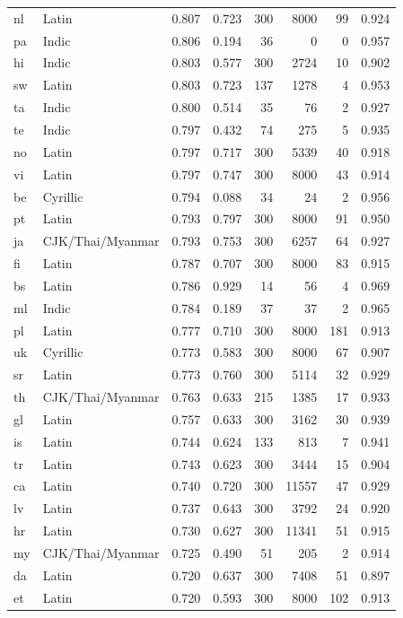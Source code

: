 \begin{tabular}{llrrrrrr}
nl & Latin & 0.807 & 0.723 & 300 & 8000 & 99 & 0.924 \\
pa & Indic & 0.806 & 0.194 & 36 & 0 & 0 & 0.957 \\
hi & Indic & 0.803 & 0.577 & 300 & 2724 & 10 & 0.902 \\
sw & Latin & 0.803 & 0.723 & 137 & 1278 & 4 & 0.953 \\
ta & Indic & 0.800 & 0.514 & 35 & 76 & 2 & 0.927 \\
te & Indic & 0.797 & 0.432 & 74 & 275 & 5 & 0.935 \\
no & Latin & 0.797 & 0.717 & 300 & 5339 & 40 & 0.918 \\
vi & Latin & 0.797 & 0.747 & 300 & 8000 & 43 & 0.914 \\
be & Cyrillic & 0.794 & 0.088 & 34 & 24 & 2 & 0.956 \\
pt & Latin & 0.793 & 0.797 & 300 & 8000 & 91 & 0.950 \\
ja & CJK/Thai/Myanmar & 0.793 & 0.753 & 300 & 6257 & 64 & 0.927 \\
fi & Latin & 0.787 & 0.707 & 300 & 8000 & 83 & 0.915 \\
bs & Latin & 0.786 & 0.929 & 14 & 56 & 4 & 0.969 \\
ml & Indic & 0.784 & 0.189 & 37 & 37 & 2 & 0.965 \\
pl & Latin & 0.777 & 0.710 & 300 & 8000 & 181 & 0.913 \\
uk & Cyrillic & 0.773 & 0.583 & 300 & 8000 & 67 & 0.907 \\
sr & Latin & 0.773 & 0.760 & 300 & 5114 & 32 & 0.929 \\
th & CJK/Thai/Myanmar & 0.763 & 0.633 & 215 & 1385 & 17 & 0.933 \\
gl & Latin & 0.757 & 0.633 & 300 & 3162 & 30 & 0.939 \\
is & Latin & 0.744 & 0.624 & 133 & 813 & 7 & 0.941 \\
tr & Latin & 0.743 & 0.623 & 300 & 3444 & 15 & 0.904 \\
ca & Latin & 0.740 & 0.720 & 300 & 11557 & 47 & 0.929 \\
lv & Latin & 0.737 & 0.643 & 300 & 3792 & 24 & 0.920 \\
hr & Latin & 0.730 & 0.627 & 300 & 11341 & 51 & 0.915 \\
my & CJK/Thai/Myanmar & 0.725 & 0.490 & 51 & 205 & 2 & 0.914 \\
da & Latin & 0.720 & 0.637 & 300 & 7408 & 51 & 0.897 \\
et & Latin & 0.720 & 0.593 & 300 & 8000 & 102 & 0.913 \\

\end{tabular}
